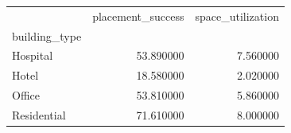 \begin{tabular}{lrr}
 & placement_success & space_utilization \\
building_type &  &  \\
Hospital & 53.890000 & 7.560000 \\
Hotel & 18.580000 & 2.020000 \\
Office & 53.810000 & 5.860000 \\
Residential & 71.610000 & 8.000000 \\
\end{tabular}
